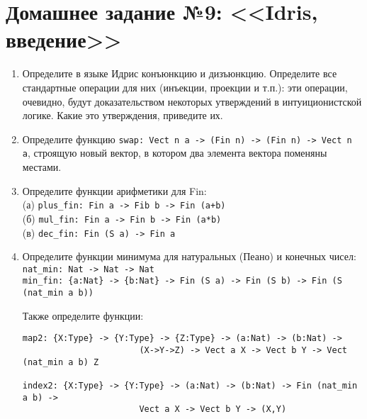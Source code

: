\documentclass[10pt,a4paper,oneside]{article}
\begin{document}
\section*{Домашнее задание №9: <<Idris, введение>>}
\begin{enumerate}
\item Определите в языке Идрис конъюнкцию и дизъюнкцию.
Определите все стандартные операции для них (инъекции, проекции и т.п.):
эти операции, очевидно, будут доказательством некоторых утверждений в интуиционистской
логике. Какие это утверждения, приведите их.

\item Определите функцию \verb!swap: Vect n a -> (Fin n) -> (Fin n) -> Vect n a!,
строящую новый вектор, в котором два элемента вектора поменяны местами.

\item Определите функции арифметики для Fin:\\
(а) \verb!plus_fin: Fin a -> Fib b -> Fin (a+b)!\\
(б) \verb!mul_fin: Fin a -> Fin b -> Fin (a*b)!\\
(в) \verb!dec_fin: Fin (S a) -> Fin a!

\item Определите функции минимума для натуральных (Пеано) и конечных чисел:\\
\verb!nat_min: Nat -> Nat -> Nat!\\
\verb!min_fin: {a:Nat} -> {b:Nat} -> Fin (S a) -> Fin (S b) -> Fin (S (nat_min a b))!

Также определите функции:
\begin{verbatim}
map2: {X:Type} -> {Y:Type} -> {Z:Type} -> (a:Nat) -> (b:Nat) -> 
                       (X->Y->Z) -> Vect a X -> Vect b Y -> Vect (nat_min a b) Z

index2: {X:Type} -> {Y:Type} -> (a:Nat) -> (b:Nat) -> Fin (nat_min a b) ->
                       Vect a X -> Vect b Y -> (X,Y)
\end{verbatim}

\end{enumerate}
\end{document}
